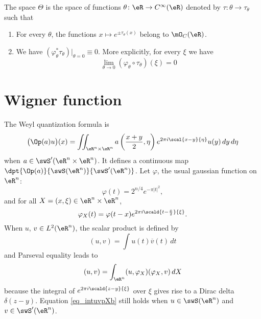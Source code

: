\begin{definition}
	The space $\Theta$ is the space of functions $\theta\colon \eR\to  C^{\infty}(\eR)$ denoted by $\tau\colon \theta\to \tau_{\theta}$ such that
	\begin{enumerate}
		\item
			For every $\theta$, the functions $x\mapsto e^{\pm\tau_{\theta}(x)}$ belong to $\mO_C(\eR)$.
		\item
			We have $(\varphi_{\theta}^*\tau_{\theta})|_{\theta=0}\equiv 0$. More explicitly, for every $\xi$ we have
			\begin{equation}
				\lim_{\theta\to 0} (\varphi_{\theta}\circ\tau_{\theta})(\xi)=0
			\end{equation}
	\end{enumerate}
\end{definition}

\section{Wigner function}

The Weyl quantization formula is
\begin{equation}
 \big( \Op(a)u \big)(x)=\iint_{\eR^n\times\eR^n} a\left( \frac{ x+y }{ 2 },\eta \right) e^{2\pi i\scal{ x-y }{ \eta }}u(y)\,dy\,d\eta
\end{equation}
when $a\in\swS'(\eR^n\times\eR^n)$. It defines a continuous map $\dpt{ \Op(a)  }{ \swS(\eR^n) }{ \swS'(\eR^n) }$. Let $\varphi$, the usual gaussian function on $\eR^n$:
\[ 
  \varphi(t)=2^{n/4} e^{-\pi| t |^2},
\]
 and for all $X=(x,\xi)\in\eR^n\times\eR^n$, 
\[ 
  \varphi_X(t)=\varphi(t-x) e^{2\pi i\scald{ t-\frac{ x }{2} }{ \xi }}.
\]
When $u$, $v\in L^2(\eR^n)$, the scalar product is defined by
\begin{equation}
(u,v)=\int u(t)\overline{ v }(t)\,dt
\end{equation}
and Parseval equality leads to 
\begin{equation}  \label{eq_intuvpXb}
  (u,v)=\int_{\eR^n}(u,\varphi_X)(\varphi_X,v)\,dX
\end{equation}
because the integral of $ e^{2\pi i\scald{ z-y }{ \xi }}$ over $\xi$ gives rise to a Dirac delta $\delta(z-y)$. Equation \eqref{eq_intuvpXb} still holds when $u\in\swS(\eR^n)$ and $v\in\swS'(\eR^n)$.


